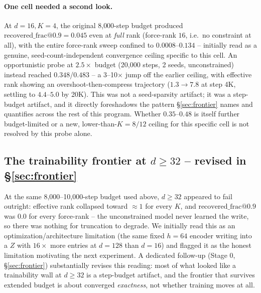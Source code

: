 \paragraph{One cell needed a second look.} At $d{=}16,K{=}4$, the original
8{,}000-step budget produced $\mathrm{recovered\_frac@0.9}=0.045$ even at
\emph{full} rank (force-rank $16$, i.e.\ no constraint at all), with the
entire force-rank sweep confined to $0.0008$--$0.134$ -- initially read as
a genuine, seed-count-independent convergence ceiling specific to this
cell. An opportunistic probe at $2.5\times$ budget (20{,}000 steps, 2
seeds, unconstrained) instead reached $0.348$/$0.483$ -- a 3--10$\times$
jump off the earlier ceiling, with effective rank showing an
overshoot-then-compress trajectory ($1.3\to7.8$ at step 4K, settling to
$4.4$--$5.0$ by 20K). This was not a seed-sparsity artifact; it was a
step-budget artifact, and it directly foreshadows the pattern
\S\ref{sec:frontier} names and quantifies across the rest of this program.
Whether $0.35$--$0.48$ is itself further budget-limited or a new,
lower-than-$K{=}8/12$ ceiling for this specific cell is not resolved by
this probe alone.

\subsection{The trainability frontier at $d\geq32$ -- revised in \S\ref{sec:frontier}}
\label{sec:taskd-frontier}

At the same 8{,}000--10{,}000-step budget used above, $d\geq32$ appeared to
fail outright: effective rank collapsed toward $\approx1$ for every $K$,
and $\mathrm{recovered\_frac@0.9}$ was $0.0$ for every force-rank -- the
unconstrained model never learned the write, so there was nothing for
truncation to degrade. We initially read this as an
optimization/architecture limitation (the same fixed $h{=}64$ encoder
writing into a $Z$ with $16\times$ more entries at $d{=}128$ than $d{=}16$)
and flagged it as the honest limitation motivating the next experiment. A
dedicated follow-up (Stage 0, \S\ref{sec:frontier}) substantially revises
this reading: most of what looked like a trainability wall at $d\geq32$ is
a step-budget artifact, and the frontier that survives extended budget is
about converged \emph{exactness}, not whether training moves at all.
